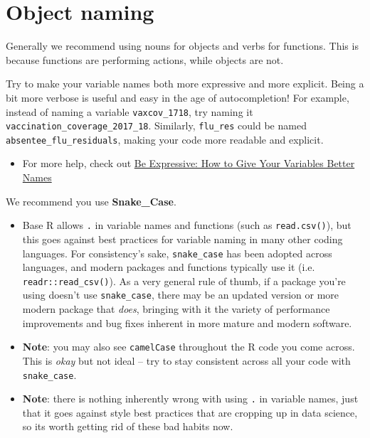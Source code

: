 \documentclass[]{book}
\providecommand{\tightlist}{%
  \setlength{\itemsep}{0pt}\setlength{\parskip}{0pt}}
\begin{document}
\hypertarget{object-naming}{%
\section{Object naming}\label{object-naming}}

Generally we recommend using nouns for objects and verbs for functions. This is because functions are performing actions, while objects are not.

Try to make your variable names both more expressive and more explicit. Being a bit more verbose is useful and easy in the age of autocompletion! For example, instead of naming a variable \texttt{vaxcov\_1718}, try naming it \texttt{vaccination\_coverage\_2017\_18}. Similarly, \texttt{flu\_res} could be named \texttt{absentee\_flu\_residuals}, making your code more readable and explicit.

\begin{itemize}
\tightlist
\item
  For more help, check out \href{https://spin.atomicobject.com/2017/11/01/good-variable-names/}{Be Expressive: How to Give Your Variables Better Names}
\end{itemize}

We recommend you use \textbf{Snake\_Case}.

\begin{itemize}
\item
  Base R allows \texttt{.} in variable names and functions (such as \texttt{read.csv()}), but this goes against best practices for variable naming in many other coding languages. For consistency's sake, \texttt{snake\_case} has been adopted across languages, and modern packages and functions typically use it (i.e. \texttt{readr::read\_csv()}). As a very general rule of thumb, if a package you're using doesn't use \texttt{snake\_case}, there may be an updated version or more modern package that \emph{does}, bringing with it the variety of performance improvements and bug fixes inherent in more mature and modern software.
\item
  \textbf{Note}: you may also see \texttt{camelCase} throughout the R code you come across. This is \emph{okay} but not ideal -- try to stay consistent across all your code with \texttt{snake\_case}.
\item
  \textbf{Note}: there is nothing inherently wrong with using \texttt{.} in variable names, just that it goes against style best practices that are cropping up in data science, so its worth getting rid of these bad habits now.
\end{itemize}
\end{document}
